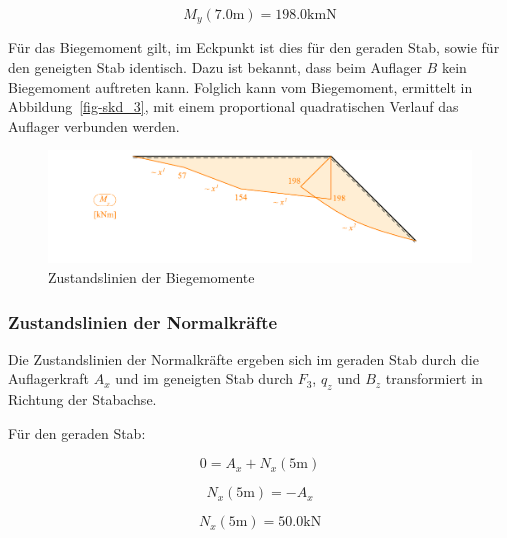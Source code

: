 \documentclass[
  12pt,
  letterpaper,
  DIV=11,
  egregdoesnotlikesansseriftitles]{scrartcl}
\begin{document}
\begin{equation}M_{y}{\left(7.0 \text{m} \right)} = 198.0 \text{k} \text{m} \text{N}\end{equation}

Für das Biegemoment gilt, im Eckpunkt ist dies für den geraden Stab,
sowie für den geneigten Stab identisch. Dazu ist bekannt, dass beim
Auflager \(B\) kein Biegemoment auftreten kann. Folglich kann vom
Biegemoment, ermittelt in Abbildung~\ref{fig-skd_3}, mit einem
proportional quadratischen Verlauf das Auflager verbunden werden.

\begin{figure}[H]

{\centering \includegraphics{BSI_HS23_Testat_02_files/mediabag/../images/Testat_02_HS23_My.pdf}

}

\caption{\label{fig-my}Zustandslinien der Biegemomente}

\end{figure}

\hypertarget{zustandslinien-der-normalkruxe4fte}{%
\subsubsection{Zustandslinien der
Normalkräfte}\label{zustandslinien-der-normalkruxe4fte}}

Die Zustandslinien der Normalkräfte ergeben sich im geraden Stab durch
die Auflagerkraft \(A_x\) und im geneigten Stab durch \(F_3\), \(q_z\)
und \(B_z\) transformiert in Richtung der Stabachse.

Für den geraden Stab:

\begin{equation}0 = A_{x} + N_{x}{\left(5 \text{m} \right)}\end{equation}

\begin{equation}N_{x}{\left(5 \text{m} \right)} = - A_{x}\end{equation}

\begin{equation}N_{x}{\left(5 \text{m} \right)} = 50.0 \text{k} \text{N}\end{equation}
\end{document}
